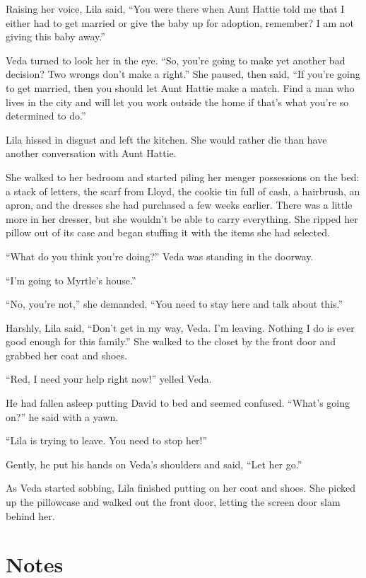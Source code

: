 \documentclass[
  letterpaper,
]{book}
\begin{document}
Raising her voice, Lila said, ``You were there when Aunt Hattie told me
that I either had to get married or give the baby up for adoption,
remember? I am not giving this baby away.''

Veda turned to look her in the eye. ``So, you're going to make yet
another bad decision? Two wrongs don't make a right.'' She paused, then
said, ``If you're going to get married, then you should let Aunt Hattie
make a match. Find a man who lives in the city and will let you work
outside the home if that's what you're so determined to do.''

Lila hissed in disgust and left the kitchen. She would rather die than
have another conversation with Aunt Hattie.

She walked to her bedroom and started piling her meager possessions on
the bed: a stack of letters, the scarf from Lloyd, the cookie tin full
of cash, a hairbrush, an apron, and the dresses she had purchased a few
weeks earlier. There was a little more in her dresser, but she wouldn't
be able to carry everything. She ripped her pillow out of its case and
began stuffing it with the items she had selected.

``What do you think you're doing?'' Veda was standing in the doorway.

``I'm going to Myrtle's house.''

``No, you're not,'' she demanded. ``You need to stay here and talk about
this.''

Harshly, Lila said, ``Don't get in my way, Veda. I'm leaving. Nothing I
do is ever good enough for this family.'' She walked to the closet by
the front door and grabbed her coat and shoes.

``Red, I need your help right now!'' yelled Veda.

He had fallen asleep putting David to bed and seemed confused. ``What's
going on?'' he said with a yawn.

``Lila is trying to leave. You need to stop her!''

Gently, he put his hands on Veda's shoulders and said, ``Let her go.''

As Veda started sobbing, Lila finished putting on her coat and shoes.
She picked up the pillowcase and walked out the front door, letting the
screen door slam behind her.

\section{Notes}\label{notes-35}
\end{document}
